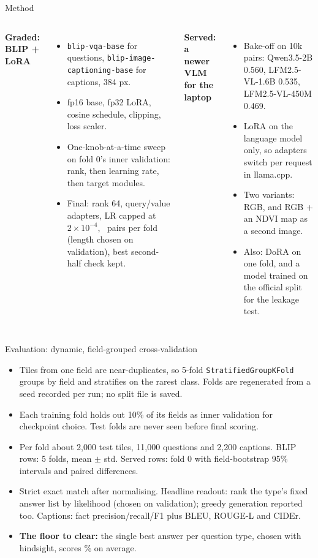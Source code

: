 \documentclass[aspectratio=169,10pt,t]{beamer}
\begin{document}
\begin{frame}{Method}
\begin{columns}[T]
\textbf{Graded: BLIP + LoRA}
\begin{itemize}
\item \texttt{blip-vqa-base} for questions, \texttt{blip-image-captioning-base} for captions, 384 px.
\item fp16 base, fp32 LoRA, cosine schedule, clipping, loss scaler.
\item One-knob-at-a-time sweep on fold 0's inner validation: rank, then learning rate, then target modules.
\item Final: rank 64, query/value adapters, LR capped at $2\!\times\!10^{-4}$, \finalPairs\ pairs per fold (length chosen on validation), best second-half check kept.
\end{itemize}
\textbf{Served: a newer VLM for the laptop}
\begin{itemize}
\item Bake-off on 10k pairs: Qwen3.5-2B 0.560, LFM2.5-VL-1.6B 0.535, LFM2.5-VL-450M 0.469.
\item LoRA on the language model only, so adapters switch per request in llama.cpp.
\item Two variants: RGB, and RGB + an NDVI map as a second image.
\item Also: DoRA on one fold, and a model trained on the official split for the leakage test.
\end{itemize}
\end{columns}
\end{frame}

\begin{frame}{Evaluation: dynamic, field-grouped cross-validation}
\begin{itemize}
\item Tiles from one field are near-duplicates, so 5-fold \texttt{StratifiedGroupKFold} groups by field and stratifies on the rarest class. Folds are regenerated from a seed recorded per run; no split file is saved.
\item Each training fold holds out 10\% of its fields as inner validation for checkpoint choice. Test folds are never seen before final scoring.
\item Per fold about 2,000 test tiles, 11,000 questions and 2,200 captions. BLIP rows: 5 folds, mean $\pm$ std. Served rows: fold 0 with field-bootstrap 95\% intervals and paired differences.
\item Strict exact match after normalising. Headline readout: rank the type's fixed answer list by likelihood (chosen on validation); greedy generation reported too. Captions: fact precision/recall/F1 plus BLEU, ROUGE-L and CIDEr.
\item \textbf{The floor to clear:} the single best answer per question type, chosen with hindsight, scores \constMean\% on average.
\end{itemize}
\end{frame}
\end{document}
